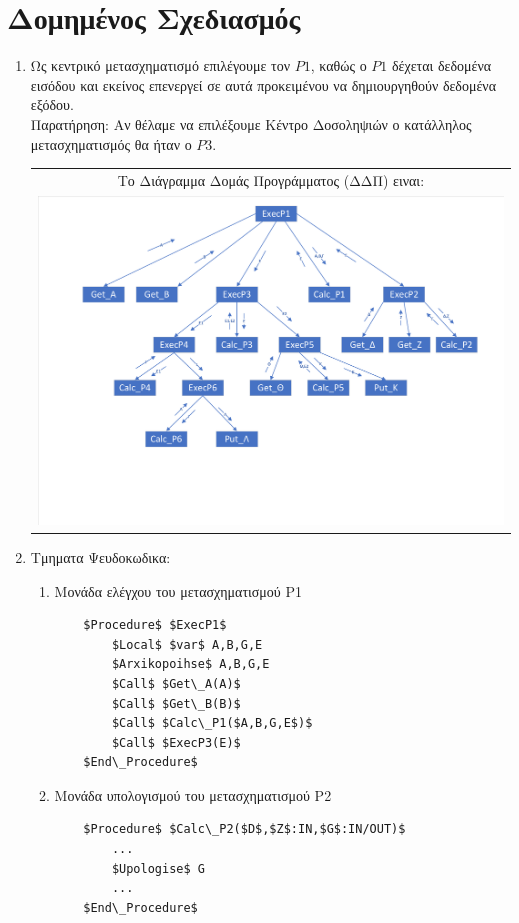 \documentclass[12pt]{article}
\newcommand\tab[1][1cm]{\hspace*{#1}}
\begin{document}
\section{Δομημένος Σχεδιασμός}
\begin{enumerate}

\item
\tab Ως κεντρικό μετασχηματισμό επιλέγουμε τον $P1$, καθώς ο $P1$ 
δέχεται δεδομένα εισόδου και εκείνος επενεργεί σε αυτά προκειμένου να δημιουργηθούν δεδομένα εξόδου.\\
\tab Παρατήρηση: Αν θέλαμε να επιλέξουμε Κέντρο Δοσοληψιών ο κατάλληλος μετασχηματισμός θα ήταν ο $P3$.

\begin{center}
\begin{tabular}{c}
Το Διάγραμμα Δομάς Προγράμματος (ΔΔΠ) ειναι:\\
\includegraphics[scale=0.5]{MerosG/DDP}
\end{tabular}
\end{center}

\newpage
\item Τμηματα Ψευδοκωδικα:
\begin{enumerate}[label*=\roman*]
	\item Mονάδα ελέγχου του μετασχηματισμού Ρ1
	
	\begin{lstlisting}
	$Procedure$ $ExecP1$
		$Local$ $var$ A,B,G,E
		$Arxikopoihse$ A,B,G,E
		$Call$ $Get\_A(A)$
		$Call$ $Get\_B(B)$
		$Call$ $Calc\_P1($A,B,G,E$)$
		$Call$ $ExecP3(E)$
	$End\_Procedure$
	\end{lstlisting}
	
	\item  Μονάδα υπολογισμού του μετασχηματισμού Ρ2
	\begin{lstlisting}
	$Procedure$ $Calc\_P2($D$,$Z$:IN,$G$:IN/OUT)$
		...
		$Upologise$ G
		...
	$End\_Procedure$
	\end{lstlisting}
	

\end{enumerate}
\end{enumerate}
\end{document}
